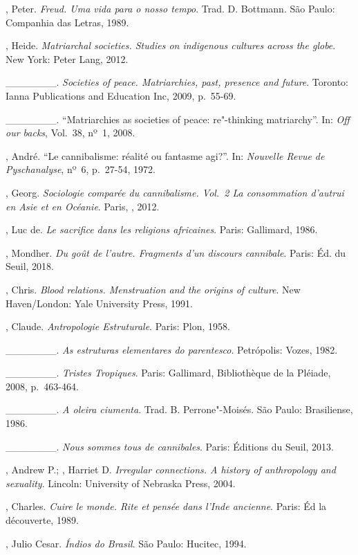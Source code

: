 \begin{Parskip}
, Peter. \emph{Freud. Uma vida para o nosso tempo}. Trad. D.
Bottmann. São Paulo: Companhia das Letras, 1989.

, Heide. \emph{Matriarchal societies. Studies on
indigenous cultures across the globe}. New York: Peter Lang, 2012.

\_\_\_\_\_\_\_. \emph{Societies of peace.
Matriarchies, past, presence and future}. Toronto: Ianna Publications
and Education Inc, 2009, p.~55-69.

\_\_\_\_\_\_\_. ``Matriarchies as societies of peace:
re"-thinking matriarchy''. In: \emph{Off our backs}, Vol.~38, nº~1, 2008.

, André. ``Le cannibalisme: réalité ou fantasme agi?''. In:
\emph{Nouvelle Revue de Pyschanalyse}, nº~6, p.~27-54, 1972.

, Georg. \emph{Sociologie comparée du cannibalisme.
Vol.~2 La consommation d'autrui en Asie et en Océanie}. Paris, , 2012.

, Luc de. \emph{Le sacrifice dans les religions africaines}. Paris: Gallimard, 1986.

, Mondher. \emph{Du goût de l'autre. Fragments d'un discours
cannibale}. Paris: Éd. du Seuil, 2018.

, Chris. \emph{Blood relations. Menstruation and the origins of
culture}. New Haven/London: Yale University Press, 1991.

, Claude. \emph{Antropologie Estruturale}. Paris: Plon, 1958.

\_\_\_\_\_\_\_. \emph{As estruturas elementares do parentesco}. Petrópolis: Vozes, 1982.

\_\_\_\_\_\_\_. \emph{Tristes Tropiques}. Paris: Gallimard, Bibliothèque de la Pléiade, 2008, p.~463-464.

\_\_\_\_\_\_\_. \emph{A oleira ciumenta}. Trad. B. Perrone"-Moisés. São Paulo: Brasiliense, 1986.

\_\_\_\_\_\_\_. \emph{Nous sommes tous de cannibales}. Paris: Éditions du Seuil, 2013.

, Andrew P.; , Harriet D. \emph{Irregular connections. A history of
anthropology and sexuality}. Lincoln: University of Nebraska Press, 2004.

, Charles. \emph{Cuire le monde. Rite et pensée dans l'Inde
ancienne}. Paris: Éd la découverte, 1989.

, Julio Cesar. \emph{Índios do Brasil}. São Paulo: Hucitec, 1994.


\end{Parskip}
